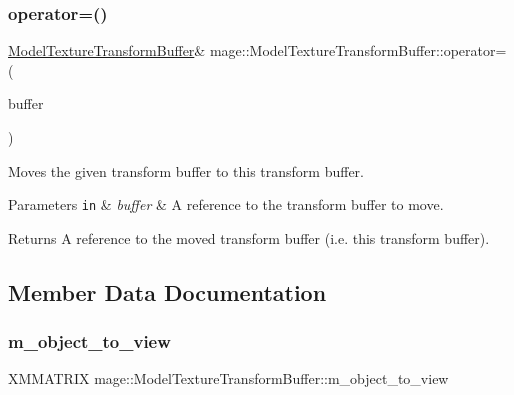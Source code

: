 \subsubsection{\texorpdfstring{operator=()}{operator=()}\hspace{0.1cm}{\footnotesize\ttfamily [2/2]}}
{\footnotesize\ttfamily \hyperlink{structmage_1_1_model_texture_transform_buffer}{Model\+Texture\+Transform\+Buffer}\& mage\+::\+Model\+Texture\+Transform\+Buffer\+::operator= (\begin{DoxyParamCaption}\item[{\hyperlink{structmage_1_1_model_texture_transform_buffer}{Model\+Texture\+Transform\+Buffer} \&\&}]{buffer }\end{DoxyParamCaption})\hspace{0.3cm}{\ttfamily [default]}}

Moves the given transform buffer to this transform buffer.


\begin{DoxyParams}[1]{Parameters}
\mbox{\tt in}  & {\em buffer} & A reference to the transform buffer to move. \\
\hline
\end{DoxyParams}
\begin{DoxyReturn}{Returns}
A reference to the moved transform buffer (i.\+e. this transform buffer). 
\end{DoxyReturn}


\subsection{Member Data Documentation}
\hypertarget{structmage_1_1_model_texture_transform_buffer_adb5e9e5b5d8c48267f0947c1ebc67b27}{}\label{structmage_1_1_model_texture_transform_buffer_adb5e9e5b5d8c48267f0947c1ebc67b27} 
\subsubsection{\texorpdfstring{m\+\_\+object\+\_\+to\+\_\+view}{m\_object\_to\_view}}
{\footnotesize\ttfamily X\+M\+M\+A\+T\+R\+IX mage\+::\+Model\+Texture\+Transform\+Buffer\+::m\+\_\+object\+\_\+to\+\_\+view}

